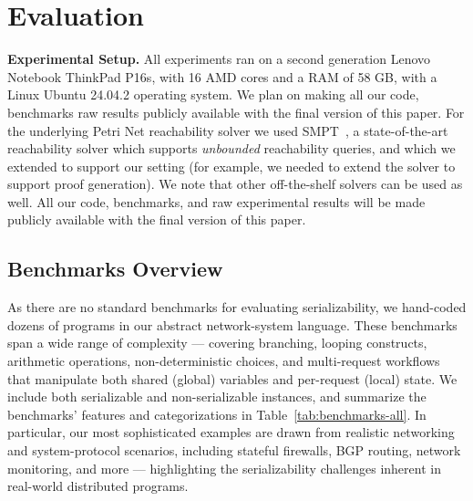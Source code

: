 \section{Evaluation}
\label{sec:evaluation}



\noindent
\textbf{Experimental Setup.}
All experiments ran on a second generation Lenovo Notebook ThinkPad P16s, with 16 AMD cores and a RAM of 58 GB, with a Linux Ubuntu 24.04.2 operating system.
%
We plan on making all our code, benchmarks raw results publicly available with the final version of this paper.
%
For the underlying Petri Net reachability solver we used SMPT~\cite{AmDa23}, a state-of-the-art reachability solver which supports \textit{unbounded} reachability queries, and which we extended to support our setting (for example, we needed to extend the solver to support proof generation). 
%
We note that other off-the-shelf solvers can be used as well.
%
All our code, benchmarks, and raw experimental results will be made publicly available with the final version of this paper.
 


\subsection{Benchmarks Overview} 
\label{subsec:benchmarks}

As there are no standard benchmarks for evaluating serializability, we hand-coded dozens of programs in our abstract network-system language. These benchmarks span a wide range of complexity --- covering branching, looping constructs, arithmetic operations, non-deterministic choices, and multi-request workflows that manipulate both shared (global) variables and per-request (local) state. 
%
We include both serializable and non-serializable instances, and summarize the benchmarks' features and categorizations in Table~\ref{tab:benchmarks-all}. 
%
In particular, our most sophisticated examples are drawn from realistic networking and system-protocol scenarios, including stateful firewalls, BGP routing, network monitoring, and more --- highlighting the serializability challenges inherent in real-world distributed programs.

